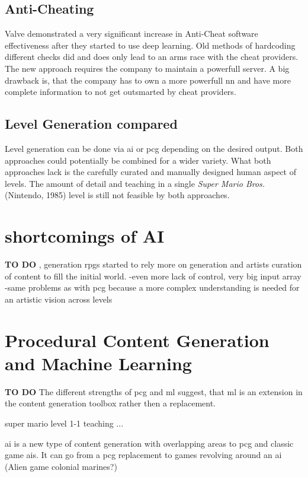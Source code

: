 \documentclass[10pt,a4paper]{article}
\begin{document}
\subsection{Anti-Cheating}
Valve demonstrated a very significant increase in Anti-Cheat software effectiveness after they started to use deep learning. Old methods of hardcoding different checks did and does only lead to an arms race with the cheat providers. The new approach requires the company to maintain a powerfull server. A big drawback is, that the company has to own a more powerfull \gls{nn} and have more complete information to not get outsmarted by cheat providers\cite{McDonald2018}.

\subsection{Level Generation compared}
Level generation can be done via \gls{ai} or \gls{pcg} depending on the desired output. Both approaches could potentially be combined for a wider variety. What both approaches lack is the carefully curated and manually designed human aspect of levels. The amount of detail and teaching in a single \textit{Super Mario Bros.} (Nintendo, 1985) level\cite{EurogamerMiyamotoInterview} is still not feasible by both approaches.

\section{shortcomings of AI}
\textbf{TO DO}
, generation \gls{rpg}s started to rely more on generation and artists curation of content to fill the initial world.
-even more lack of control, very big input array
-same problems as with \gls{pcg} because a more complex understanding is needed for an artistic vision across levels

\section{Procedural Content Generation and Machine Learning}
\textbf{TO DO}
The different strengths of \gls{pcg} and \gls{ml} suggest, that \gls{ml} is an extension in the content generation toolbox rather then a replacement.

super mario level 1-1 teaching ...

\gls{ai} is a new type of content generation with overlapping areas to \gls{pcg} and classic game \gls{ai}s. It can go from a \gls{pcg} replacement to games revolving around an \gls{ai} (Alien game colonial marines?)
\end{document}
